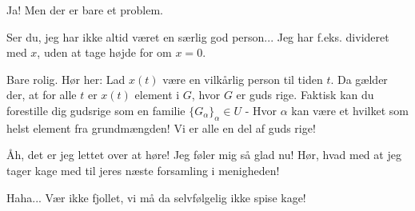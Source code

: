 \documentclass[a4paper,11pt]{article}
\begin{document}
\begin{sketch}
 Ja! Men der er bare et problem.


 Ser du, jeg har ikke altid været en særlig god person... Jeg har f.eks. divideret med $x$, uden at tage højde for om $x = 0$.


 Bare rolig. Hør her: Lad $x(t)$ være en vilkårlig person til tiden $t$. Da gælder der, at for alle $t$ er $x(t)$ element i $G$, hvor $G$ er guds rige. Faktisk kan du forestille dig gudsrige som en familie $\{G_\alpha\}_\alpha \in U$ - Hvor $\alpha$ kan være et hvilket som helst element fra grundmængden! Vi er alle en del af guds rige!

 Åh, det er jeg lettet over at høre! Jeg føler mig så glad nu! Hør, hvad med at jeg tager kage med til jeres næste forsamling i menigheden!


 Haha... Vær ikke fjollet, vi må da selvfølgelig ikke spise kage!

\end{sketch}
\end{document}
